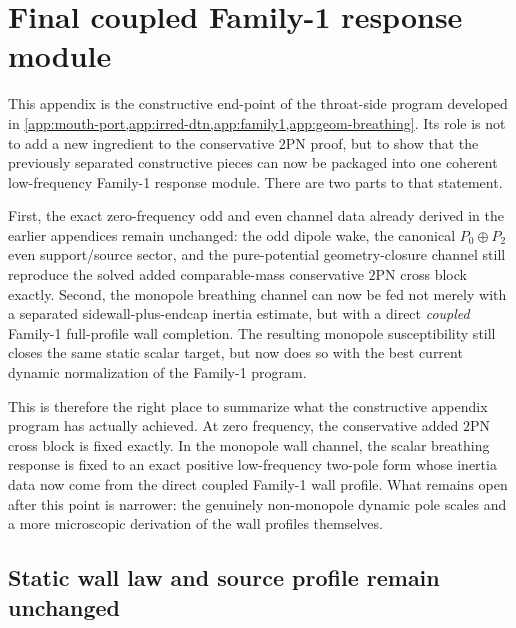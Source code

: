 \documentclass[11pt]{article}
\newcommand{\TwoPN}{\mathrm{2PN}}
\begin{document}
\section{Final coupled Family-1 response module}
\label{app:family1-final}

This appendix is the constructive end-point of the throat-side program developed in
\cref{app:mouth-port,app:irred-dtn,app:family1,app:geom-breathing}.
Its role is not to add a new ingredient to the conservative \(\TwoPN\) proof, but to
show that the previously separated constructive pieces can now be packaged into one
coherent low-frequency Family-1 response module.
There are two parts to that statement.

First, the exact zero-frequency odd and even channel data already derived in the earlier
appendices remain unchanged: the odd dipole wake, the canonical
\(P_0\oplus P_2\) even support/source sector, and the pure-potential geometry-closure
channel still reproduce the solved added comparable-mass conservative \(\TwoPN\) cross
block exactly.
Second, the monopole breathing channel can now be fed not merely with a separated
sidewall-plus-endcap inertia estimate, but with a direct \emph{coupled} Family-1
full-profile wall completion.
The resulting monopole susceptibility still closes the same static scalar target,
but now does so with the best current dynamic normalization of the Family-1 program.

This is therefore the right place to summarize what the constructive appendix program has
actually achieved.
At zero frequency, the conservative added \(\TwoPN\) cross block is fixed exactly.
In the monopole wall channel, the scalar breathing response is fixed to an exact positive
low-frequency two-pole form whose inertia data now come from the direct coupled
Family-1 wall profile.
What remains open after this point is narrower: the genuinely non-monopole dynamic pole
scales and a more microscopic derivation of the wall profiles themselves.

\subsection{Static wall law and source profile remain unchanged}
\label{app:family1-final-static-law}
\end{document}
